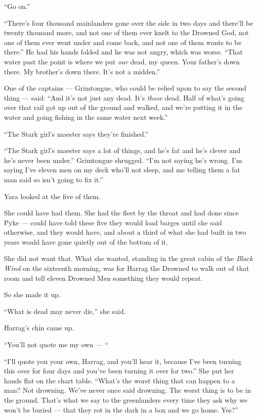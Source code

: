 “Go on.”

“There’s four thousand mainlanders gone over the side in two days and there’ll be twenty thousand more, and not one of them ever knelt to the Drowned God, not one of them ever went under and come back, and not one of them wants to be there.” He had his hands folded and he was not angry, which was worse. “That water past the point is where we put \textit{our} dead, my queen. Your father’s down there. My brother’s down there. It’s not a midden.”

One of the captains — Grimtongue, who could be relied upon to say the second thing — said: “And it’s not just any dead. It’s \textit{those} dead. Half of what’s going over that rail got up out of the ground and walked, and we’re putting it in the water and going fishing in the same water next week.”

“The Stark girl’s maester says they’re finished.”

“The Stark girl’s maester says a lot of things, and he’s fat and he’s clever and he’s never been under.” Grimtongue shrugged. “I’m not saying he’s wrong. I’m saying I’ve eleven men on my deck who’ll not sleep, and me telling them a fat man said so isn’t going to fix it.”

Yara looked at the five of them.

She could have had them. She had the fleet by the throat and had done since Pyke — could have told these five they would load barges until she said otherwise, and they would have, and about a third of what she had built in two years would have gone quietly out of the bottom of it.

She did not want that. What she wanted, standing in the great cabin of the \textit{Black Wind} on the sixteenth morning, was for Harrag the Drowned to walk out of that room and tell eleven Drowned Men something they would repeat.

So she made it up.

\sceneBreak

“What is dead may never die,” she said.

Harrag’s chin came up.

“You’ll not quote me my own — “

“I’ll quote you your own, Harrag, and you’ll hear it, because I’ve been turning this over for four days and you’ve been turning it over for two.” She put her hands flat on the chart table. “What’s the worst thing that can happen to a man? Not drowning. We’ve never once said drowning. The worst thing is to be in the ground. That’s what we say to the greenlanders every time they ask why we won’t be buried — that they rot in the dark in a box and we go home. Yes?”

